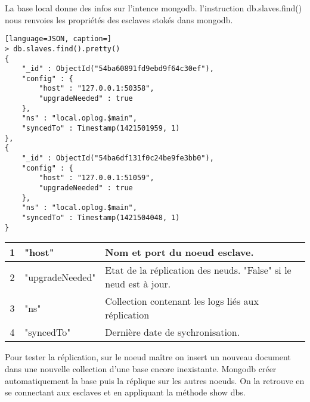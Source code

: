             {\let\thefootnote\relax{}
                
            
\newpage

    \par La base local donne des infos sur l'intence mongodb. l'instruction db.slaves.find() nous renvoies les propriétés des esclaves stokés dans mongodb. 
    
    \begin{lstlisting}[language=JSON, caption=]
> db.slaves.find().pretty()
{
	"_id" : ObjectId("54ba60891fd9ebd9f64c30ef"),
	"config" : {
		"host" : "127.0.0.1:50358",
		"upgradeNeeded" : true
	},
	"ns" : "local.oplog.$main",
	"syncedTo" : Timestamp(1421501959, 1)
},
{
	"_id" : ObjectId("54ba6df131f0c24be9fe3bb0"),
	"config" : {
		"host" : "127.0.0.1:51059",
		"upgradeNeeded" : true
	},
	"ns" : "local.oplog.$main",
	"syncedTo" : Timestamp(1421504048, 1)
}

    \end{lstlisting}
    
\begin{tabularx}{14cm}{|c|p{3cm}|X|}
    \hline
    1 & "host" & Nom et port du noeud esclave. \\
    \hline
    2 & "upgradeNeeded" & Etat de la réplication des neuds. "False" si le neud est à jour. \\
    \hline
    3 & "ns" & Collection contenant les logs liés aux réplication \\
    \hline
    4 & "syncedTo" & Dernière date de sychronisation. \\
    \hline
\end{tabularx}

    \par
        Pour tester la réplication, sur le noeud maître on insert un nouveau document dans une nouvelle collection d'une base encore inexistante. Mongodb créer automatiquement la base puis la réplique sur les autres noeuds. On la retrouve en se connectant aux esclaves et en appliquant la méthode show dbs.

}
